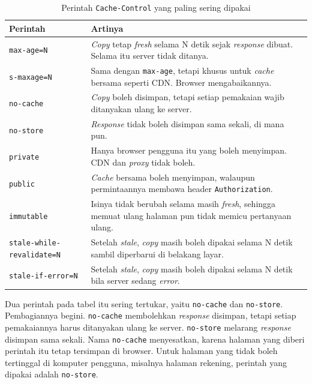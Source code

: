 \begin{table}[!htb]
  \centering
  \caption{Perintah \texttt{Cache-Control} yang paling sering dipakai}
  \label{tab:cache-control}
  \begin{tabularx}{\textwidth}{lX}
    \hline
    \textbf{Perintah} & \textbf{Artinya} \\
    \hline
    \texttt{max-age=N} & \textit{Copy} tetap \textit{fresh} selama N detik sejak \textit{response} dibuat. Selama itu server tidak ditanya. \\
    \hline
    \texttt{s-maxage=N} & Sama dengan \texttt{max-age}, tetapi khusus untuk \textit{cache} bersama seperti CDN. Browser mengabaikannya. \\
    \hline
    \texttt{no-cache} & \textit{Copy} boleh disimpan, tetapi setiap pemakaian wajib ditanyakan ulang ke server. \\
    \hline
    \texttt{no-store} & \textit{Response} tidak boleh disimpan sama sekali, di mana pun. \\
    \hline
    \texttt{private} & Hanya browser pengguna itu yang boleh menyimpan. CDN dan \textit{proxy} tidak boleh. \\
    \hline
    \texttt{public} & \textit{Cache} bersama boleh menyimpan, walaupun permintaannya membawa header \texttt{Authorization}. \\
    \hline
    \texttt{immutable} & Isinya tidak berubah selama masih \textit{fresh}, sehingga memuat ulang halaman pun tidak memicu pertanyaan ulang. \\
    \hline
    \texttt{stale-while-revalidate=N} & Setelah \textit{stale}, \textit{copy} masih boleh dipakai selama N detik sambil diperbarui di belakang layar. \\
    \hline
    \texttt{stale-if-error=N} & Setelah \textit{stale}, \textit{copy} masih boleh dipakai selama N detik bila server sedang \textit{error}. \\
    \hline
  \end{tabularx}
\end{table}

Dua perintah pada tabel itu sering tertukar, yaitu \texttt{no-cache} dan
\texttt{no-store}. Pembagiannya begini. \texttt{no-cache} membolehkan \textit{response}
disimpan, tetapi setiap pemakaiannya harus ditanyakan ulang ke server.
\texttt{no-store} melarang \textit{response} disimpan sama sekali. Nama
\texttt{no-cache} menyesatkan, karena halaman yang diberi perintah itu tetap
tersimpan di browser. Untuk halaman yang tidak boleh tertinggal di komputer
pengguna, misalnya halaman rekening, perintah yang dipakai adalah
\texttt{no-store}.

